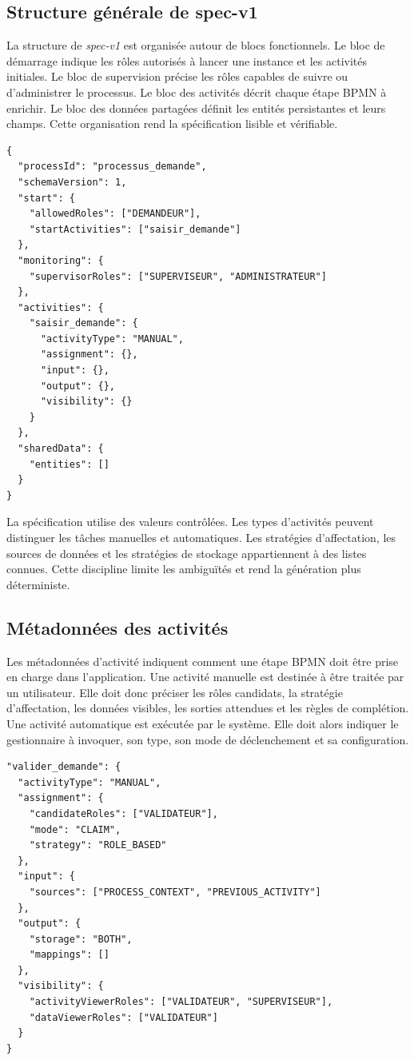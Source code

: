 \subsection{Structure générale de spec-v1}

La structure de \textit{spec-v1} est organisée autour de blocs fonctionnels. Le bloc de démarrage indique les rôles autorisés à lancer une instance et les activités initiales. Le bloc de supervision précise les rôles capables de suivre ou d'administrer le processus. Le bloc des activités décrit chaque étape BPMN à enrichir. Le bloc des données partagées définit les entités persistantes et leurs champs. Cette organisation rend la spécification lisible et vérifiable.

\begin{lstlisting}[caption={Structure simplifiée de la spécification spec-v1},label={lst:chap3-structure-specv1}]
{
  "processId": "processus_demande",
  "schemaVersion": 1,
  "start": {
    "allowedRoles": ["DEMANDEUR"],
    "startActivities": ["saisir_demande"]
  },
  "monitoring": {
    "supervisorRoles": ["SUPERVISEUR", "ADMINISTRATEUR"]
  },
  "activities": {
    "saisir_demande": {
      "activityType": "MANUAL",
      "assignment": {},
      "input": {},
      "output": {},
      "visibility": {}
    }
  },
  "sharedData": {
    "entities": []
  }
}
\end{lstlisting}

La spécification utilise des valeurs contrôlées. Les types d'activités peuvent distinguer les tâches manuelles et automatiques. Les stratégies d'affectation, les sources de données et les stratégies de stockage appartiennent à des listes connues. Cette discipline limite les ambiguïtés et rend la génération plus déterministe.

\subsection{Métadonnées des activités}

Les métadonnées d'activité indiquent comment une étape BPMN doit être prise en charge dans l'application. Une activité manuelle est destinée à être traitée par un utilisateur. Elle doit donc préciser les rôles candidats, la stratégie d'affectation, les données visibles, les sorties attendues et les règles de complétion. Une activité automatique est exécutée par le système. Elle doit alors indiquer le gestionnaire à invoquer, son type, son mode de déclenchement et sa configuration.

\begin{lstlisting}[caption={Exemple d'activité enrichie dans spec-v1},label={lst:chap3-activite-enrichie}]
"valider_demande": {
  "activityType": "MANUAL",
  "assignment": {
    "candidateRoles": ["VALIDATEUR"],
    "mode": "CLAIM",
    "strategy": "ROLE_BASED"
  },
  "input": {
    "sources": ["PROCESS_CONTEXT", "PREVIOUS_ACTIVITY"]
  },
  "output": {
    "storage": "BOTH",
    "mappings": []
  },
  "visibility": {
    "activityViewerRoles": ["VALIDATEUR", "SUPERVISEUR"],
    "dataViewerRoles": ["VALIDATEUR"]
  }
}
\end{lstlisting}

